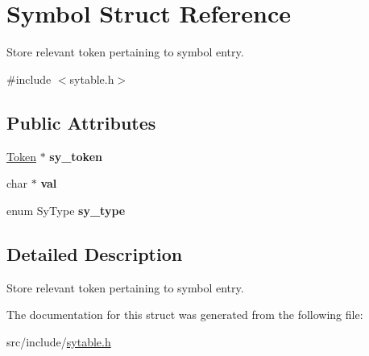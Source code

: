 \hypertarget{struct_symbol}{}\section{Symbol Struct Reference}
\label{struct_symbol}


Store relevant token pertaining to symbol entry.  




{\ttfamily \#include $<$sytable.\+h$>$}

\subsection*{Public Attributes}
\begin{DoxyCompactItemize}
\item 
\mbox{\label{struct_symbol_a978e6b2eaf61ecb95479ac8ac3abc043}} 
\mbox{\hyperlink{struct_token}{Token}} $\ast$ {\bfseries sy\+\_\+token}
\item 
\mbox{\label{struct_symbol_ab3bb7c5e016a8d3b63e2786b71eca5ae}} 
char $\ast$ {\bfseries val}
\item 
\mbox{\label{struct_symbol_a58043e30d9c9764c82d7762b2d7d1fe6}} 
enum Sy\+Type {\bfseries sy\+\_\+type}
\end{DoxyCompactItemize}


\subsection{Detailed Description}
Store relevant token pertaining to symbol entry. 

The documentation for this struct was generated from the following file\+:\begin{DoxyCompactItemize}
\item 
src/include/\mbox{\hyperlink{sytable_8h}{sytable.\+h}}\end{DoxyCompactItemize}
